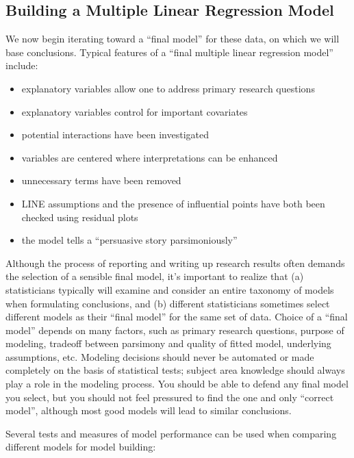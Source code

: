 \documentclass[
]{krantz}
\providecommand{\tightlist}{%
  \setlength{\itemsep}{0pt}\setlength{\parskip}{0pt}}
\begin{document}
\subsection{Building a Multiple Linear Regression Model}\label{multreg_build}

We now begin iterating toward a ``final model'' for these data, on which we will base conclusions. Typical features of a ``final multiple linear regression model'' include:

\begin{itemize}
\tightlist
\item
  explanatory variables allow one to address primary research questions
\item
  explanatory variables control for important covariates
\item
  potential interactions have been investigated
\item
  variables are centered where interpretations can be enhanced
\item
  unnecessary terms have been removed
\item
  LINE assumptions and the presence of influential points have both been checked using residual plots
\item
  the model tells a ``persuasive story parsimoniously''
\end{itemize}

Although the process of reporting and writing up research results often demands the selection of a sensible final model, it's important to realize that (a) statisticians typically will examine and consider an entire taxonomy of models when formulating conclusions, and (b) different statisticians sometimes select different models as their ``final model'' for the same set of data. Choice of a ``final model'' depends on many factors, such as primary research questions, purpose of modeling, tradeoff between parsimony and quality of fitted model, underlying assumptions, etc. Modeling decisions should never be automated or made completely on the basis of statistical tests; subject area knowledge should always play a role in the modeling process. You should be able to defend any final model you select, but you should not feel pressured to find the one and only ``correct model'', although most good models will lead to similar conclusions.

Several tests and measures of model performance can be used when comparing different models for model building:
\end{document}
